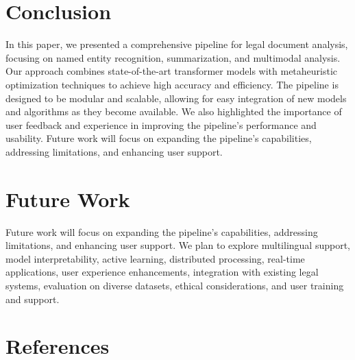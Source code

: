 \documentclass[conference]{IEEEtran}
\begin{document}
\section{Conclusion}
In this paper, we presented a comprehensive pipeline for legal document analysis, focusing on named entity recognition, summarization, and multimodal analysis. Our approach combines state-of-the-art transformer models with metaheuristic optimization techniques to achieve high accuracy and efficiency. The pipeline is designed to be modular and scalable, allowing for easy integration of new models and algorithms as they become available. We also highlighted the importance of user feedback and experience in improving the pipeline's performance and usability. Future work will focus on expanding the pipeline's capabilities, addressing limitations, and enhancing user support.
\section{Future Work}
Future work will focus on expanding the pipeline's capabilities, addressing limitations, and enhancing user support. We plan to explore multilingual support, model interpretability, active learning, distributed processing, real-time applications, user experience enhancements, integration with existing legal systems, evaluation on diverse datasets, ethical considerations, and user training and support.
\section{References}
\end{document}
